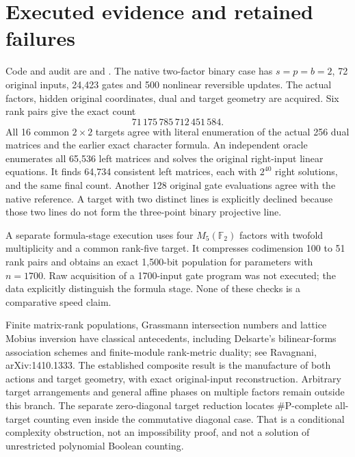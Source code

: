 \documentclass[11pt]{article}
\newcommand{\F}{\mathbb F}\newcommand{\End}{\operatorname{End}}
\begin{document}
\section{Executed evidence and retained failures}
Code and audit are  and
. The native two-factor binary case
has $s=p=b=2$, 72 original inputs, 24,423 gates and 500 nonlinear reversible
updates. The actual factors, hidden original coordinates, dual and target
geometry are acquired. Six rank pairs give the exact count
\[
 71\,175\,785\,712\,451\,584.
\]
All 16 common $2\times2$ targets agree with literal enumeration of the
actual 256 dual matrices and the earlier exact character formula.
An independent oracle enumerates all 65,536 left matrices and solves the
original right-input linear equations. It finds 64,734 consistent left
matrices, each with $2^{40}$ right solutions, and the same final count.
Another 128 original gate evaluations agree with the native reference.
A target with two distinct lines is explicitly declined because those two
lines do not form the three-point binary projective line.

A separate formula-stage execution uses four $M_5(\F_2)$ factors with
twofold multiplicity and a common rank-five target. It compresses codimension
100 to 51 rank pairs and obtains an exact 1,500-bit population for parameters
with $n=1700$. Raw acquisition of a 1700-input gate program was not executed;
the data explicitly distinguish the formula stage. None of these checks is
a comparative speed claim.

Finite matrix-rank populations, Grassmann intersection numbers and lattice
Mobius inversion have classical antecedents, including Delsarte's
bilinear-forms association schemes and finite-module rank-metric duality;
see Ravagnani, arXiv:1410.1333. The established composite result is the
manufacture of both actions and target geometry, with exact original-input
reconstruction. Arbitrary target arrangements and general affine phases on
multiple factors remain outside this branch. The separate zero-diagonal
target reduction locates \#P-complete all-target counting even inside the
commutative diagonal case. That is a conditional complexity obstruction,
not an impossibility proof, and not a solution of unrestricted polynomial
Boolean counting.
\end{document}
